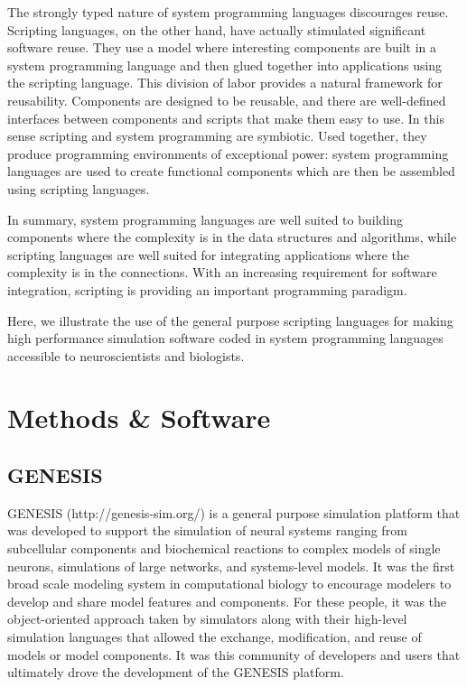 \documentclass[12pt]{article}
\begin{document}
The strongly typed nature of system programming languages discourages
reuse. Scripting languages, on the other hand, have actually
stimulated significant software reuse. They use a model where
interesting components are built in a system programming language and
then glued together into applications using the scripting language.
This division of labor provides a natural framework for reusability.
Components are designed to be reusable, and there are well-defined
interfaces between components and scripts that make them easy to use.
In this sense scripting and system programming are symbiotic. Used
together, they produce programming environments of exceptional power:
system programming languages are used to create functional components
which are then be assembled using scripting languages.

In summary, system programming languages are well suited to building
components where the complexity is in the data structures and
algorithms, while scripting languages are well suited for integrating
applications where the complexity is in the connections. With an
increasing requirement for software integration, scripting is
providing an important programming paradigm.

Here, we illustrate the use of the general purpose scripting languages
for making high performance simulation software coded in system
programming languages accessible to neuroscientists and biologists.




\section{Methods \& Software}

\subsection{GENESIS}

GENESIS (http://genesis-sim.org/) is a general purpose simulation
platform that was developed to support the simulation of neural
systems ranging from subcellular components and biochemical reactions
to complex models of single neurons, simulations of large networks,
and systems-level models. It was the first broad scale modeling system
in computational biology to encourage modelers to develop and share
model features and components. For these people, it was the
object-oriented approach taken by simulators along with their
high-level simulation languages that allowed the exchange,
modification, and reuse of models or model
components. It was this community of developers and
users that ultimately drove the development of the GENESIS platform.
\end{document}
